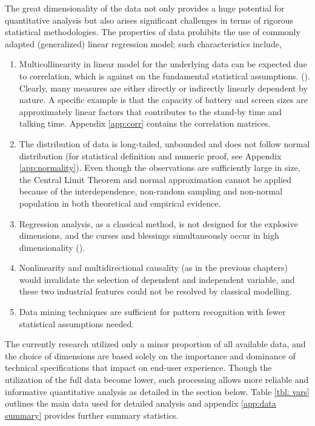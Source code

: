 \documentclass[utf8,english]{gradu3}
\begin{document}
The great dimensionality of the data not only provides a huge potential for quantitative analysis but also arises significant challenges in terms of rigorous statistical methodologies. The properties of data prohibits the use of commonly adapted (generalized) linear regression model; such characteristics include,

\begin{enumerate}
    \item Multicollinearity in linear model for the underlying data can be expected due to correlation, which is against on the fundamental statistical assumptions. (\cite{farrar1967multicollinearity}). Clearly, many measures are either directly or indirectly linearly dependent by nature. A specific example is that the capacity of battery and screen sizes are approximately linear factors that contributes to the stand-by time and talking time. Appendix \ref{app:corr} contains the correlation matrices.
    \item The distribution of data is long-tailed, unbounded and does not follow normal distribution (for statistical definition and numeric proof, see Appendix \ref{app:normality}). Even though the observations are sufficiently large in size, the Central Limit Theorem and normal approximation cannot be applied because of the interdependence, non-random sampling and non-normal population in both theoretical and empirical evidence.
    \item Regression analysis, as a classical method, is not designed for the explosive dimensions, and the curses and blessings simultaneously occur in high dimensionality (\cite{donoho2000high}).
    \item Nonlinearity and multidirectional causality (as in the previous chapters) would invalidate the selection of dependent and independent variable, and these two industrial features could not be resolved by classical modelling.
    \item Data mining techniques are sufficient for pattern recognition with fewer statistical assumptions needed.
\end{enumerate}

The currently research utilized only a minor proportion of all available data, and the choice of dimensions are based solely on the importance and dominance of technical specifications that impact on end-user experience. Though the utilization of the full data become lower, such processing allows more reliable and informative quantitative analysis as detailed in the section below. Table \ref{tbl: vars} outlines the main data used for detailed analysis and appendix \ref{app:data summary} provides further summary statistics.
\end{document}
